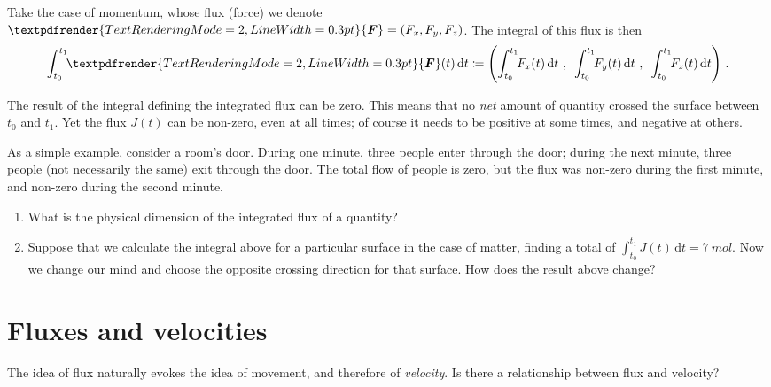 \documentclass[a4paper,12pt,%
onecolumn,oneside,%
british%
]{memoir}
\renewcommand*{\bm}[1]{\textpdfrender{TextRenderingMode=2,LineWidth=0.3pt}{\boldsymbol{#1}}}
\newcommand*{\di}{\mathrm{d}}%
\newcommand*{\defd}{\coloneqq}
\renewcommand*{\|}[1][]{\nonscript\:#1\vert\nonscript\:\mathopen{}}
\newcommand*{\yti}{t_{0}}
\newcommand*{\ytf}{t_{1}}
\newcommand*{\yJ}{J}
\newcommand*{\yF}{\bm{F}}
\begin{document}
Take the case of momentum, whose flux (force) we denote $\yF=(F_{x}, F_{y}, F_{z})$. The integral of this flux is then
\begin{equation}
  \label{eq:total_flow_integral_vector}
  \int_{\yti}^{\ytf}\!\! \yF(t)\,\di t \defd
  \Biggl(
  \int_{\yti}^{\ytf}\!\! F_{x}(t)\,\di t \ ,\enspace
  \int_{\yti}^{\ytf}\!\! F_{y}(t)\,\di t \ ,\enspace
  \int_{\yti}^{\ytf}\!\! F_{z}(t)\,\di t
  \Biggr) \ .
\end{equation}

\medskip

\begin{warning}
  The result of the integral defining the integrated flux can be zero. This means that no \emph{net} amount of quantity crossed the surface between $\yti$ and $\ytf$. Yet the flux $\yJ(t)$ can be non-zero, even at all times; of course it needs to be positive at some times, and negative at others.
\end{warning}
As a simple example, consider a room's door. During one minute, three people enter through the door; during the next minute, three people (not necessarily the same) exit through the door. The total flow of people is zero, but the flux was non-zero during the first minute, and non-zero during the second minute.

\smallskip

\begin{exercise}
  \begin{enumerate}[exerc]
  \item What is the physical dimension of the integrated flux of a quantity?
  \item Suppose that we calculate the integral above for a particular surface in the case of matter, finding a total of $\int_{\yti}^{\ytf}\!\! \yJ(t)\,\di t = \qty{7}{mol}$. Now we change our mind and choose the opposite crossing direction for that surface. How does the result above change?
  \end{enumerate}
\end{exercise}

\section{Fluxes and velocities}
\label{sec:fluxes_velocities}

The idea of flux naturally evokes the idea of movement, and therefore of \emph{velocity}. Is there a relationship between flux and velocity?
\end{document}
